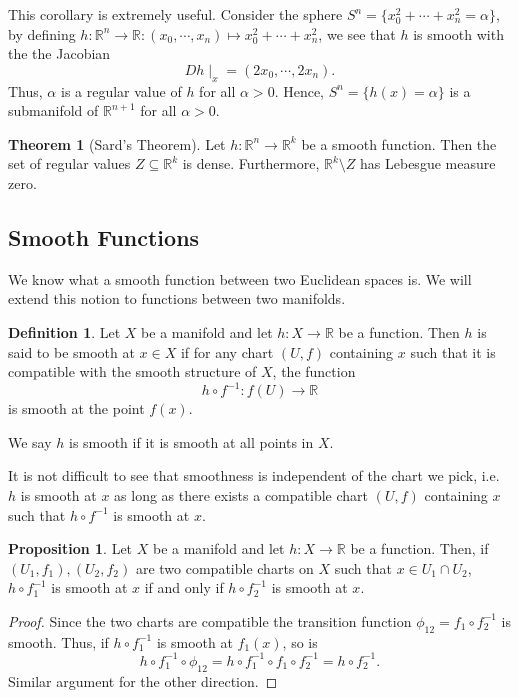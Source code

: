 \documentclass[]{article}
\theoremstyle{definition}
\newtheorem{theorem}{Theorem}
\theoremstyle{definition}
\newtheorem{definition}{Definition}[section]
\newtheorem{proposition}{Proposition}[section]
\begin{document}
This corollary is extremely useful. Consider the sphere 
\(S^n = \{x_0^2 + \cdots + x_n^2 = \alpha\}\), by defining 
\(h : \mathbb{R}^n \to \mathbb{R} : (x_0, \cdots, x_n) \mapsto 
x_0^2 + \cdots + x_n^2\), we see that \(h\) is smooth with the the Jacobian 
\[Dh\mid_x = (2x_0, \cdots, 2x_n).\]
Thus, \(\alpha\) is a regular value of \(h\) for all \(\alpha > 0\). Hence, 
\(S^n = \{h(x) = \alpha\}\) is a submanifold of \(\mathbb{R}^{n+1}\) for 
all \(\alpha > 0\).

\begin{theorem}[Sard's Theorem]
  Let \(h : \mathbb{R}^n \to \mathbb{R}^k\) be a smooth function. Then the set 
  of regular values \(Z \subseteq \mathbb{R}^k\) is dense. Furthermore, 
  \(\mathbb{R}^k \setminus Z\) has Lebesgue measure zero.
\end{theorem}

\subsection{Smooth Functions}

We know what a smooth function between two Euclidean spaces is. We will extend 
this notion to functions between two manifolds. 

\begin{definition}
  Let \(X\) be a manifold and let \(h : X \to \mathbb{R}\) be a function. Then 
  \(h\) is said to be smooth at \(x \in X\) if for any chart \((U, f)\) containing 
  \(x\) such that it is compatible with the smooth structure of \(X\), the 
  function 
  \[h \circ f^{-1} : f(U) \to \mathbb{R}\]
  is smooth at the point \(f(x)\).

  We say \(h\) is smooth if it is smooth at all points in \(X\).
\end{definition}

It is not difficult to see that smoothness is independent of the chart we 
pick, i.e. \(h\) is smooth at \(x\) as long as there exists a compatible chart 
\((U, f)\) containing \(x\) such that \(h \circ f^{-1}\) is smooth at \(x\).

\begin{proposition}
  Let \(X\) be a manifold and let \(h : X \to \mathbb{R}\) be a function. Then, 
  if \((U_1, f_1), (U_2, f_2)\) are two compatible charts on \(X\) such that 
  \(x \in U_1 \cap U_2\), \(h \circ f_1^{-1}\) is smooth at \(x\) if and only if 
  \(h \circ f_2^{-1}\) is smooth at \(x\).
\end{proposition}
\begin{proof}
  Since the two charts are compatible the transition function 
  \(\phi_{12} = f_1 \circ f_2^{-1}\) is smooth. Thus, if \(h \circ f_1^{-1}\) 
  is smooth at \(f_1(x)\), so is 
  \[h \circ f_1^{-1} \circ \phi_{12} = h \circ f_1^{-1} \circ f_1 \circ f_2^{-1} 
    = h \circ f_2^{-1}.\]
  Similar argument for the other direction.
\end{proof}
\end{document}
